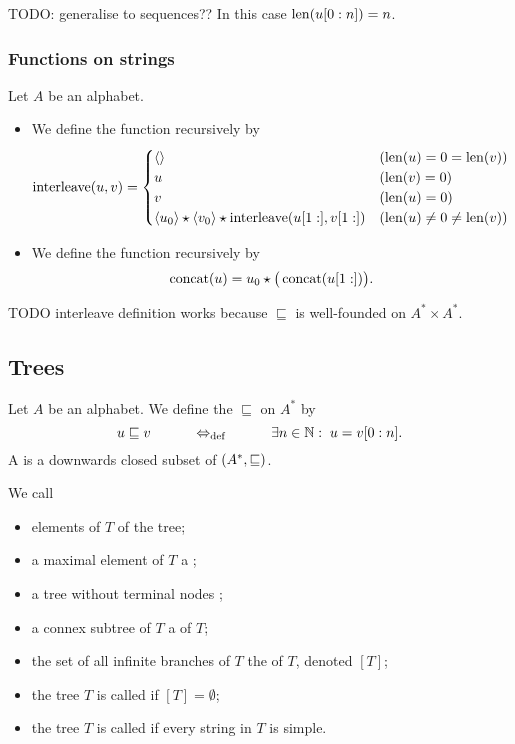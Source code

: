 TODO: generalise to sequences?? In this case $\operatorname{len}(u[0:n]) = n$.

\subsubsection{Functions on strings}
\begin{definition}
Let $A$ be an alphabet.
\begin{itemize}
\item We define the  function recursively by
\[ \operatorname{interleave}(u,v) = \begin{cases}
\left\langle  \right\rangle & (\operatorname{len}(u) = 0 = \operatorname{len}(v)) \\
u & (\operatorname{len}(v) = 0) \\
v & (\operatorname{len}(u) = 0) \\
\left\langle u_0 \right\rangle\star \left\langle v_0 \right\rangle\star \operatorname{interleave}(u[1:], v[1:]) & (\operatorname{len}(u) \neq 0 \neq \operatorname{len}(v))
\end{cases} \]
\item We define the  function recursively by
\[ \operatorname{concat}(u) = u_0 \star \big(\operatorname{concat}(u[1:])\big). \]
\end{itemize}
\end{definition}
TODO interleave definition works because $\sqsubseteq$ is well-founded on $A^*\times A^*$.

\subsection{Trees}
\begin{definition}
Let $A$ be an alphabet. We define the  $\sqsubseteq$ on $A^*$ by
\[ u \sqsubseteq v \qquad\quad\Leftrightarrow_{\text{def}}\quad\qquad \exists n\in \mathbb{N}: \; u = v[0:n]. \]
A  is a downwards closed subset of $\left( A^*, \sqsubseteq \right)$.

We call
\begin{itemize}
\item elements of $T$  of the tree;
\item a maximal element of $T$ a ;
\item a tree without terminal nodes ;
\item a connex subtree of $T$ a  of $T$;
\item the set of all infinite branches of $T$ the  of $T$, denoted $[T]$;
\item the tree $T$ is called  if $[T] = \emptyset$;
\item the tree $T$ is called  if every string in $T$ is simple.
\end{itemize}
\end{definition}

